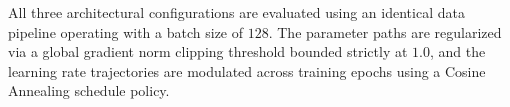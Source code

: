 \documentclass[conference]{IEEEtran}
\begin{document}
All three architectural configurations are evaluated using an identical data pipeline operating with a batch size of $128$. The parameter paths are regularized via a global gradient norm clipping threshold bounded strictly at $1.0$, and the learning rate trajectories are modulated across training epochs using a Cosine Annealing schedule policy.




\end{document}
